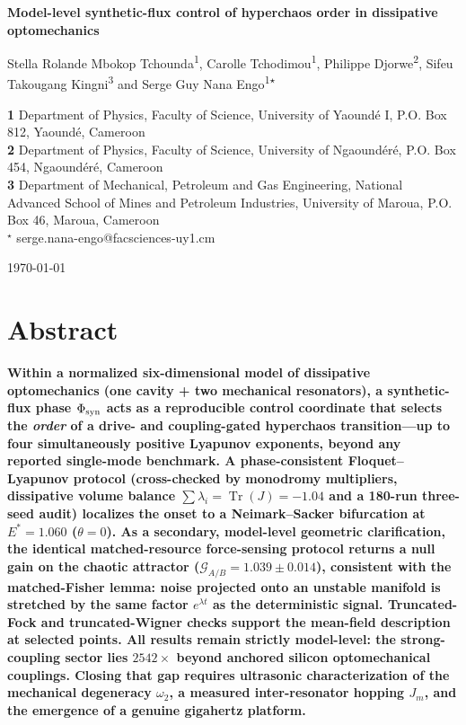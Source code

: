 \documentclass[Phys]{SciPost}
\begin{document}
\begin{center}{\Large \textbf{
Model-level synthetic-flux control of hyperchaos order in dissipative optomechanics\\
}}\end{center}

\begin{center}
Stella Rolande Mbokop Tchounda\textsuperscript{1},
Carolle Tchodimou\textsuperscript{1},
Philippe Djorwe\textsuperscript{2},
Sifeu Takougang Kingni\textsuperscript{3} and
Serge Guy Nana Engo\textsuperscript{1$\star$}
\end{center}

\begin{center}
{\bf 1} Department of Physics, Faculty of Science, University of Yaound\'e I, P.O. Box 812, Yaound\'e, Cameroon
\\
{\bf 2} Department of Physics, Faculty of Science, University of Ngaound\'er\'e, P.O. Box 454, Ngaound\'er\'e, Cameroon
\\
{\bf 3} Department of Mechanical, Petroleum and Gas Engineering, National Advanced School of Mines and Petroleum Industries, University of Maroua, P.O. Box 46, Maroua, Cameroon
\\
${}^\star$ {\small \sf serge.nana-engo@facsciences-uy1.cm}
\end{center}

\begin{center}
\today
\end{center}\section*{Abstract}

{\bf
Within a normalized six-dimensional model of dissipative optomechanics (one cavity + two mechanical resonators), a synthetic-flux phase $\Phi_{\rm syn}$ acts as a reproducible control coordinate that selects the \emph{order} of a drive- and coupling-gated hyperchaos transition---up to four simultaneously positive Lyapunov exponents, beyond any reported single-mode benchmark. A phase-consistent Floquet--Lyapunov protocol (cross-checked by monodromy multipliers, dissipative volume balance $\sum\lambda_i=\operatorname{Tr}(J)=-1.04$ and a 180-run three-seed audit) localizes the onset to a Neimark--Sacker bifurcation at $E^{*}=\num{1.060}$ ($\theta=0$). As a secondary, model-level geometric clarification, the identical matched-resource force-sensing protocol returns a null gain on the chaotic attractor ($\mathcal{G}_{A/B}=\num{1.039}\pm\num{0.014}$), consistent with the matched-Fisher lemma: noise projected onto an unstable manifold is stretched by the same factor $e^{\lambda t}$ as the deterministic signal. Truncated-Fock and truncated-Wigner checks support the mean-field description at selected points. All results remain strictly model-level: the strong-coupling sector lies $\num{2542}\times$ beyond anchored silicon optomechanical couplings. Closing that gap requires ultrasonic characterization of the mechanical degeneracy $\omega_2$, a measured inter-resonator hopping $J_m$, and the emergence of a genuine gigahertz platform.
}
\end{document}
